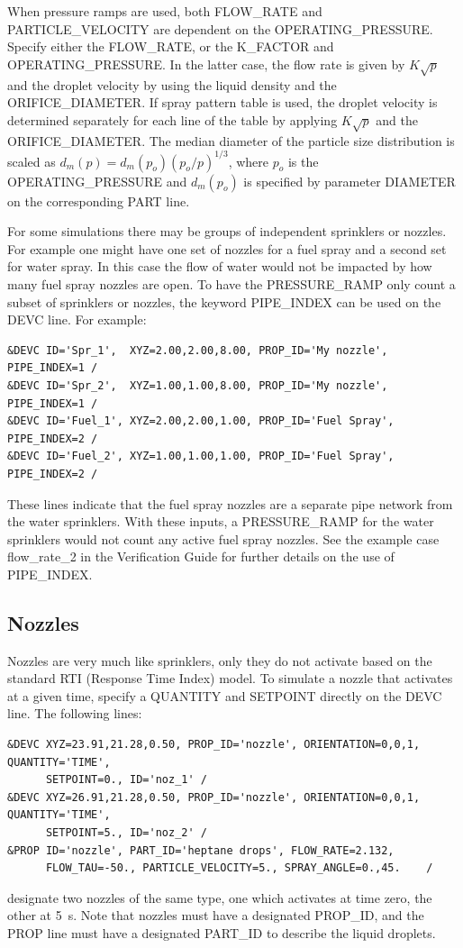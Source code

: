 \documentclass[11pt]{book}
\begin{document}
When pressure ramps are used, both {\ct FLOW\_RATE} and {\ct PARTICLE\_VELOCITY} are dependent on the {\ct OPERATING\_PRESSURE}. Specify either the {\ct FLOW\_RATE}, or the {\ct K\_FACTOR} and {\ct OPERATING\_PRESSURE}. In the latter case, the flow rate is given by $K \sqrt{p}$ and the droplet velocity by using the liquid density and the {\ct ORIFICE\_DIAMETER}.  If spray pattern table is used, the droplet velocity is determined separately for each line of the table by applying $K\sqrt{p}$ and the {\ct ORIFICE\_DIAMETER}. The median diameter of the particle size distribution is scaled as $d_m(p) = d_m(p_o)(p_o/p)^{1/3}$, where $p_o$ is the {\ct OPERATING\_PRESSURE} and $d_m(p_o)$ is specified by parameter {\ct DIAMETER} on the corresponding {\ct PART} line.

For some simulations there may be groups of independent sprinklers or nozzles.  For example one might have one set of nozzles for a fuel spray and a second set for water spray.  In this case the flow of water would not be impacted by how many fuel spray nozzles are open.  To have the {\ct PRESSURE\_RAMP} only count a subset of sprinklers or nozzles, the keyword {\ct PIPE\_INDEX} can be used on the {\ct DEVC} line. For example:
\begin{lstlisting}
&DEVC ID='Spr_1',  XYZ=2.00,2.00,8.00, PROP_ID='My nozzle',  PIPE_INDEX=1 /
&DEVC ID='Spr_2',  XYZ=1.00,1.00,8.00, PROP_ID='My nozzle',  PIPE_INDEX=1 /
&DEVC ID='Fuel_1', XYZ=2.00,2.00,1.00, PROP_ID='Fuel Spray', PIPE_INDEX=2 /
&DEVC ID='Fuel_2', XYZ=1.00,1.00,1.00, PROP_ID='Fuel Spray', PIPE_INDEX=2 /
\end{lstlisting}
These lines indicate that the fuel spray nozzles are a separate pipe network from the water sprinklers.  With these inputs, a {\ct PRESSURE\_RAMP} for the water sprinklers would not count any active fuel spray nozzles.  See the example case {\ct flow\_rate\_2} in the Verification Guide for further details on the use of {\ct PIPE\_INDEX}.

\subsection{Nozzles}
\label{info:nozzles}

Nozzles are very much like sprinklers, only they do not activate based on the standard RTI (Response Time Index) model. To simulate a nozzle that activates at a given time, specify a {\ct QUANTITY} and {\ct SETPOINT} directly on the {\ct DEVC} line. The following lines:
\begin{lstlisting}
&DEVC XYZ=23.91,21.28,0.50, PROP_ID='nozzle', ORIENTATION=0,0,1, QUANTITY='TIME',
      SETPOINT=0., ID='noz_1' /
&DEVC XYZ=26.91,21.28,0.50, PROP_ID='nozzle', ORIENTATION=0,0,1, QUANTITY='TIME',
      SETPOINT=5., ID='noz_2' /
&PROP ID='nozzle', PART_ID='heptane drops', FLOW_RATE=2.132,
      FLOW_TAU=-50., PARTICLE_VELOCITY=5., SPRAY_ANGLE=0.,45.    /
\end{lstlisting}
designate two nozzles of the same type, one which activates at time zero, the other at 5~s. Note that nozzles must have a designated
{\ct PROP\_ID}, and the {\ct PROP} line must have a designated {\ct PART\_ID} to describe the liquid droplets.
\end{document}
